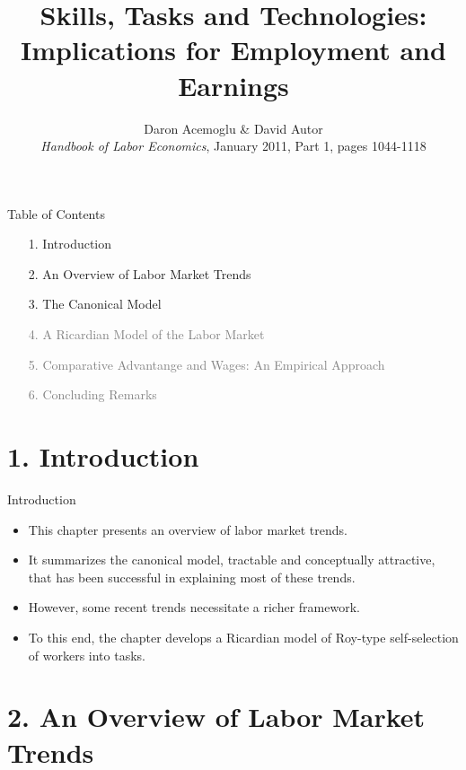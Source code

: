\documentclass[notes=show]{beamer}
\begin{document}
\title[Skill, Tasks and Technologies]{Skills, Tasks and Technologies: Implications for Employment and Earnings}
\subtitle{}
\date{Daron Acemoglu \& David Autor \bigskip \\
\textit{Handbook of Labor Economics}, January 2011, Part 1, pages 1044-1118}
\author{}
\maketitle

\begin{frame}{Table of Contents}
\begin{itemize}
\item[1.] Introduction \medskip
\item[2.] An Overview of Labor Market Trends \medskip
\item[3.] The Canonical Model \medskip
\item[\textcolor{gray}{4.}] \textcolor{gray}{A Ricardian Model of the Labor Market} \medskip
\item[\textcolor{gray}{5.}] \textcolor{gray}{Comparative Advantange and Wages: An Empirical Approach} \medskip
\item[\textcolor{gray}{6.}] \textcolor{gray}{Concluding Remarks}
\end{itemize}
\end{frame}

\section{1. Introduction}

\begin{frame}{Introduction}
\begin{itemize}
\item This chapter presents an overview of labor market trends. \bigskip
\item It summarizes the canonical model, tractable and conceptually attractive, that has been successful in explaining most of these trends. \bigskip
\item However, some recent trends necessitate a richer framework.\bigskip
\item To this end, the chapter develops a Ricardian model of Roy-type self-selection of workers into tasks.
\end{itemize}
\end{frame}

\section{2. An Overview of Labor Market Trends}
\end{document}
